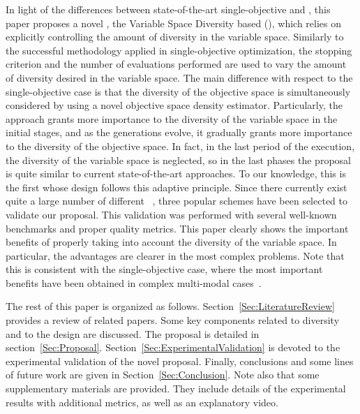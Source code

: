 In light of the differences between state-of-the-art single-objective \EAS{} and \MOEAS{}, 
this paper proposes a novel \MOEA{}, the Variable Space Diversity based \MOEA{} (\VSDMOEA{}), 
which relies on explicitly controlling the amount of diversity in the variable space.
%
Similarly to the successful methodology applied in single-objective optimization, the stopping criterion and the 
number of evaluations performed are used to vary the amount of diversity desired in the variable space.
%
The main difference with respect to the single-objective case is that the diversity of the objective space is simultaneously considered by using a novel objective space density estimator.
%
Particularly, the approach grants more importance to the diversity of the variable space in the initial stages, and 
as the generations evolve, it gradually grants more importance to the diversity of the objective space.
%
In fact, in the last period of the execution, the diversity of the variable space is neglected, so in the last phases the proposal 
is quite similar to current state-of-the-art approaches.
%
To our knowledge, this is the first \MOEA{} whose design follows this adaptive principle.
%
Since there currently exist quite a large number of different \MOEAS{}~\cite{Joel:MOEA_APPLICATIONS_BOOK_KCTAN}, 
three popular schemes have been selected to validate our proposal.
%
This validation was performed with several well-known benchmarks and proper quality metrics.
%
This paper clearly shows the important benefits of properly taking into account the diversity of the variable space.
%
In particular, the advantages are clearer in the most complex problems.
%
Note that this is consistent with the single-objective case, where the most important benefits have been obtained
in complex multi-modal cases~\cite{Segura:17}.

The rest of this paper is organized as follows. 
%
Section~\ref{Sec:LiteratureReview} provides a review of related papers.
%
Some key components related to diversity and to the \VSDMOEA{} design are discussed.
%
The \VSDMOEA{} proposal is detailed in section~\ref{Sec:Proposal}.
%
Section~\ref{Sec:ExperimentalValidation} is devoted to the experimental validation of the novel proposal.
%
Finally, conclusions and some lines of future work are given in Section~\ref{Sec:Conclusion}.
%
Note also that some supplementary materials are provided.
%
They include details of the experimental results with additional metrics, as well as an explanatory video.
